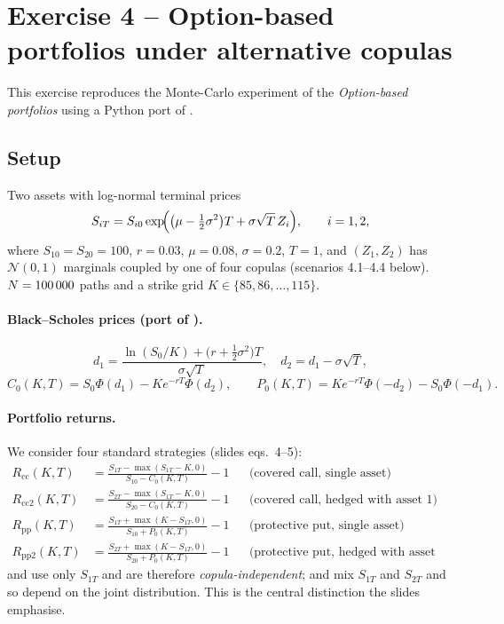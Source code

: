 \section{Exercise 4 -- Option-based portfolios under alternative copulas}
\label{sec:ex4}

This exercise reproduces the Monte-Carlo experiment of the
\emph{Option-based portfolios} using a Python port of
.

\subsection{Setup}

Two assets with log-normal terminal prices
\[
S_{iT}=S_{i0}\exp\!\Bigl(\bigl(\mu-\tfrac12\sigma^2\bigr)T+\sigma\sqrt{T}\,Z_i\Bigr),
\qquad i=1,2,
\]
where $S_{10}=S_{20}=100$, $r=0.03$, $\mu=0.08$, $\sigma=0.2$, $T=1$, and
$(Z_1,Z_2)$ has $\mathcal{N}(0,1)$ marginals coupled by one of four copulas
(scenarios 4.1--4.4 below). $N=100\,000$ paths and a strike grid
$K\in\{85,86,\ldots,115\}$.

\paragraph{Black--Scholes prices (port of ).}
\[
d_1=\frac{\ln(S_0/K)+\bigl(r+\tfrac12\sigma^2\bigr)T}{\sigma\sqrt T},\quad
d_2=d_1-\sigma\sqrt T,
\]
\[
C_0(K,T)=S_0\Phi(d_1)-Ke^{-rT}\Phi(d_2),\qquad
P_0(K,T)=Ke^{-rT}\Phi(-d_2)-S_0\Phi(-d_1).
\]

\paragraph{Portfolio returns.}
We consider four standard strategies (slides eqs.~4--5):
\begin{align}
R_{\text{cc}}(K,T) &=\frac{S_{1T}-\max(S_{1T}-K,0)}{S_{10}-C_0(K,T)}-1
&&\text{(covered call, single asset)}\\
R_{\text{cc2}}(K,T)&=\frac{S_{2T}-\max(S_{1T}-K,0)}{S_{20}-C_0(K,T)}-1
&&\text{(covered call, hedged with asset 1)}\\
R_{\text{pp}}(K,T) &=\frac{S_{1T}+\max(K-S_{1T},0)}{S_{10}+P_0(K,T)}-1
&&\text{(protective put, single asset)}\\
R_{\text{pp2}}(K,T)&=\frac{S_{2T}+\max(K-S_{1T},0)}{S_{20}+P_0(K,T)}-1
&&\text{(protective put, hedged with asset 1)}
\end{align}
 and  use only $S_{1T}$ and are therefore
\emph{copula-independent};  and  mix $S_{1T}$ and $S_{2T}$
and so depend on the joint distribution. This is the central distinction the
slides emphasise.

